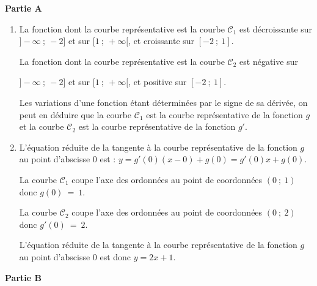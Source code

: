 \medskip

\textbf{Partie A}

\medskip



\begin{enumerate}
\item  La fonction dont la courbe représentative est la courbe $\mathcal{C}_{1}$ est décroissante sur $]-\infty~;~-2]$ et sur $[1~;~+\infty[$, et croissante sur $[-2~;~1]$.

La fonction dont la courbe représentative est la courbe $\mathcal{C}_{2}$ est négative sur

{$]-\infty~;~-2]$} et sur $[1~;~+\infty[$, et positive sur $[-2~;~1]$.

Les variations d'une fonction étant déterminées par le signe de sa dérivée, on peut en déduire que la courbe $\mathcal{C}_{1}$ est la courbe représentative de la fonction $g$ et la courbe $\mathcal{C}_{2}$ est la courbe représentative de la fonction $g'$. 


\item L'équation réduite de la tangente à la 
courbe représentative de la fonction $g$ au point d'abscisse 0 est : $y = g'(0)(x - 0)+ g(0)=g'(0)x+g(0)$.

La courbe $\mathcal{C}_{1}$ coupe l'axe des ordonnées au point de coordonnées $(0~;~1)$ donc $g(0)~=~1$.

La courbe $\mathcal{C}_{2}$ coupe l'axe des ordonnées au point de coordonnées $(0~;~2)$ donc $g'(0)~=~2$.

L'équation réduite de la tangente à la courbe représentative de la fonction $g$ au point d'abscisse 0 est donc $y = 2x+1$.
\end{enumerate}

\medskip

\textbf{Partie B}

\medskip



